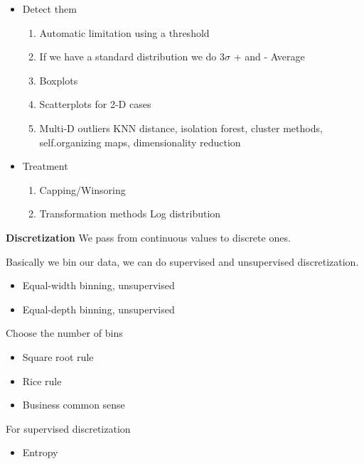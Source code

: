 \begin{itemize}
    \item Detect them
    \begin{enumerate}
        \item Automatic limitation using a threshold
        \item If we have a standard distribution we do $3\sigma$ + and - Average
        \item Boxplots
        \item Scatterplots for 2-D cases
        \item Multi-D outliers \ra KNN distance, isolation forest, cluster methods, self.organizing maps, dimensionality reduction 
    \end{enumerate}

    \item Treatment
    \begin{enumerate}
        \item Capping/Winsoring
        \item Transformation methods \ra Log distribution
    \end{enumerate}

\end{itemize}


\textbf{Discretization} \ra We pass from continuous values to discrete ones. 

\vspace{10pt}

Basically we bin our data, we can do supervised and unsupervised discretization.

\begin{itemize}
    \item Equal-width binning, unsupervised
    \item Equal-depth binning, unsupervised
\end{itemize}

Choose the number of bins

\begin{itemize}
    \item Square root rule
    \item Rice rule
    \item Business common sense 
\end{itemize}

For supervised discretization
\begin{itemize}
    \item Entropy
\end{itemize}

